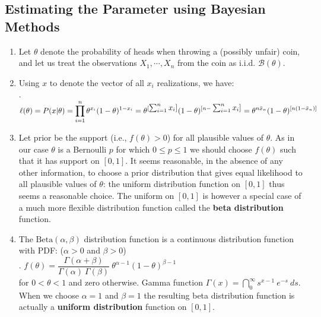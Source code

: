 \subsection{Estimating the Parameter using Bayesian Methods}

\begin{enumerate}
    \item Let $\theta$ denote the probability of heads when throwing a (possibly unfair) coin, and let us treat the observations $X_1, \cdots , X_n$ from the coin as i.i.d. $\mathcal{B}(\theta)$.
    \hfill \cite{statistics/book/Statistics-for-Data-Scientists/Maurits-Kaptein}

    \item Using $x$ to denote the vector of all $x_i$ realizations, we have:
    \hfill \cite{statistics/book/Statistics-for-Data-Scientists/Maurits-Kaptein}
    \\[0.2cm]
    .\hfill
    $
        \ell(\theta) 
        = P(x|\theta)
        = \displaystyle\prod^n_{ i=1} \theta^{x _i} (1 - \theta)^{1-x_i}
        = \theta^{[\textstyle\sum^n _{i=1} x_i]} (1 - \theta)^{[n-\textstyle\sum^n_{i=1} x_i ]}
        = \theta^{n \bar{x} _n} (1 - \theta)^{[n(1- \bar{x}_ n )]}
    $
    \hfill \cite{statistics/book/Statistics-for-Data-Scientists/Maurits-Kaptein}

    \item Let prior be the support (i.e., $f (\theta) > 0$) for all plausible values of $\theta$.
    As in our case $\theta$ is a Bernoulli $p$ for which $0 \leq p \leq 1$ we should choose $f (\theta)$ such that it has support on $[0, 1]$. 
    It seems reasonable, in the absence of any other information, to choose a prior distribution that gives equal likelihood to all plausible values of $\theta$: the uniform distribution function on $[0, 1]$ thus seems a reasonable choice. 
    The uniform on $[0, 1]$ is however a special case of a much more flexible distribution function called the \textbf{beta distribution} function.
    \hfill \cite{statistics/book/Statistics-for-Data-Scientists/Maurits-Kaptein}

    \item The $\text{Beta}(\alpha, \beta)$ distribution function is a continuous distribution function with PDF: ($\alpha > 0$ and $\beta > 0$)
    \hfill \cite{statistics/book/Statistics-for-Data-Scientists/Maurits-Kaptein}
    \\[0.2cm]
    .\hfill
    $
        f (\theta) = \dfrac{\Gamma (\alpha + \beta) }{\Gamma (\alpha)\ \Gamma (\beta)}\ \theta^{\alpha-1}(1 - \theta)^{\beta-1}
    $
    \hfill \cite{statistics/book/Statistics-for-Data-Scientists/Maurits-Kaptein}
    \\[0.1cm]
    for $0 < \theta < 1$ and zero otherwise.
    Gamma function $\Gamma (x) =\dint ^\infty _0 s^ {x-1}\ e^{-s}\ ds$.
    When we choose $\alpha = 1$ and $\beta = 1$ the resulting beta distribution function is actually a \textbf{uniform distribution} function on $[0, 1]$.
    \hfill \cite{statistics/book/Statistics-for-Data-Scientists/Maurits-Kaptein}


\end{enumerate}

